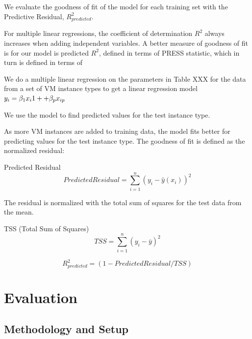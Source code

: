 \documentclass{acm_proc_article-sp}
\begin{document}
We evaluate the goodness of fit of the model for each training set with the Predictive Residual, $R^2_{predicted}$.

For multiple linear regressions, the coefficient of determination $R^2$ always increases when adding independent variables.  A better measure of goodness of fit is for our model is predicted $R^2$, defined in terms of PRESS statistic, which in turn is defined in terms of

We do a multiple linear regression on the parameters in Table XXX for the data from a set of VM instance types to get a linear regression model $y_i = \beta_1 x_i1+\dotfill+\beta_{p}x_{ip}$

We use the model to find predicted values for the test instance type.

As more VM instances are added to training data, the model fits better for predicting values for the test instance type.  The goodness of fit is defined as the normalized residual:

\begin{definition}
Predicted Residual
\begin{displaymath}{
Predicted Residual=\sum_{i=1}^{n} (y_i - \hat{y}(x_i))^{2}
}\end{displaymath}

\end{definition}

The residual is normalized with the total sum of squares for the test data from the mean.

\begin{definition}
TSS (Total Sum of Squares)
\begin{displaymath}{
TSS=\sum_{i=1}^{n} (y_i - \bar{y})^{2}
}\end{displaymath}

\begin{displaymath}{
R_{predicted}^2 = (1 - PredictedResidual/TSS)
}\end{displaymath}
\end{definition}

\section{Evaluation}
\label{sec:eval}
\vspace{10pt}

\subsection{Methodology and Setup}
\vspace{10pt}
\end{document}
